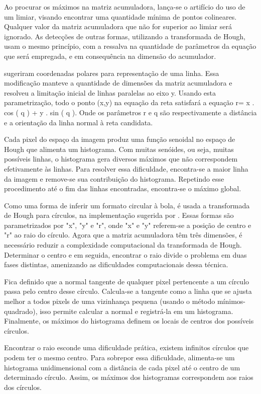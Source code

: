 Ao procurar os máximos na matriz acumuladora, lança-se o artifício do uso de um limiar, visando encontrar uma quantidade mínima de pontos colineares. Qualquer valor da matriz acumuladora que não for superior ao limiar será ignorado. As detecções de outras formas, utilizando a transformada de Hough, usam o mesmo princípio, com a ressalva na quantidade de parâmetros da equação que será empregada, e em consequência na dimensão do acumulador.
 
 sugeriram coordenadas polares para representação de uma linha. Essa modificação manteve a quantidade de dimensões da matriz acumuladora e resolveu a limitação inicial de linhas paralelas ao eixo y. Usando esta parametrização, todo o ponto (x,y) na equação da reta satisfará a equação r= x . cos ( q ) + y . sin ( q ). Onde os parâmetros r e q são respectivamente a distância e a orientação da linha normal à reta candidata.

Cada pixel do espaço da imagem produz uma função senoidal no espaço de Hough que alimenta um histograma. Com muitas senóides, ou seja, muitas possíveis linhas, o histograma gera diversos máximos que não correspondem efetivamente às linhas. Para resolver essa dificuldade, encontra-se a maior linha da imagem e remove-se sua contribuição do histograma. Repetindo esse procedimento até o fim das linhas encontradas, encontra-se o máximo global.

Como uma forma de inferir um formato circular à bola, é usada a transformada de Hough para círculos, na implementação sugerida por . Essas formas são parametrizados por "x", "y" e "r", onde "x" e "y" referem-se a posição de centro e "r" ao raio do círculo. Agora que a matriz acumuladora têm três dimensões, é necessário reduzir a complexidade computacional da transformada de Hough. Determinar o centro e em seguida, encontrar o raio divide o problema em duas fases distintas, amenizando as dificuldades computacionais dessa técnica.

Fica definido que a normal tangente de qualquer pixel pertencente a um círculo passa pelo centro desse círculo. Calcula-se a tangente como a linha que se ajusta melhor a todos pixels de uma vizinhança pequena (usando o método mínimos-quadrado), isso permite calcular a normal e registrá-la em um histograma. Finalmente, os máximos do histograma definem os locais de centros dos possíveis círculos. 

Encontrar o raio esconde uma dificuldade prática, existem infinitos círculos que podem ter o mesmo centro. Para sobrepor essa dificuldade, alimenta-se um histograma unidimensional com a distância de cada pixel até o centro de um determinado círculo. Assim, os máximos dos histogramas correspondem aos raios dos círculos.

